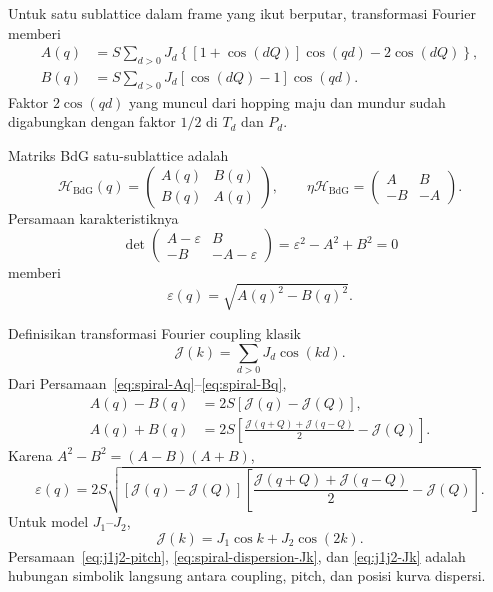 \documentclass[11pt,a4paper]{article}
\newcommand{\mH}{\mathcal H}
\begin{document}
Untuk satu sublattice dalam frame yang ikut berputar, transformasi Fourier memberi
\begin{align}
A(q)&=S\sum_{d>0}J_d
\left\{[1+\cos(dQ)]\cos(qd)-2\cos(dQ)\right\},\label{eq:spiral-Aq}\\
B(q)&=S\sum_{d>0}J_d
[\cos(dQ)-1]\cos(qd).
\label{eq:spiral-Bq}
\end{align}
Faktor $2\cos(qd)$ yang muncul dari hopping maju dan mundur sudah digabungkan dengan faktor $1/2$ di $T_d$ dan $P_d$.

Matriks BdG satu-sublattice adalah
\begin{equation}
\mH_{\mathrm{BdG}}(q)=
\begin{pmatrix}A(q)&B(q)\\B(q)&A(q)\end{pmatrix},
\qquad
\eta\mH_{\mathrm{BdG}}=
\begin{pmatrix}A&B\\-B&-A\end{pmatrix}.
\end{equation}
Persamaan karakteristiknya
\begin{equation}
\det
\begin{pmatrix}
A-\varepsilon&B\\-B&-A-\varepsilon
\end{pmatrix}
=\varepsilon^2-A^2+B^2=0
\end{equation}
memberi
\begin{equation}
\boxed{\varepsilon(q)=\sqrt{A(q)^2-B(q)^2}.}
\label{eq:spiral-dispersion-AB}
\end{equation}

Definisikan transformasi Fourier coupling klasik
\begin{equation}
\mathcal J(k)=\sum_{d>0}J_d\cos(kd).
\end{equation}
Dari Persamaan~\eqref{eq:spiral-Aq}--\eqref{eq:spiral-Bq},
\begin{align}
A(q)-B(q)&=2S[\mathcal J(q)-\mathcal J(Q)],\\
A(q)+B(q)&=2S\left[\frac{\mathcal J(q+Q)+\mathcal J(q-Q)}{2}-\mathcal J(Q)\right].
\end{align}
Karena $A^2-B^2=(A-B)(A+B)$,
\begin{equation}
\boxed{
\varepsilon(q)=2S\sqrt{
[\mathcal J(q)-\mathcal J(Q)]
\left[
\frac{\mathcal J(q+Q)+\mathcal J(q-Q)}{2}-\mathcal J(Q)
\right]}.}
\label{eq:spiral-dispersion-Jk}
\end{equation}
Untuk model $J_1$--$J_2$,
\begin{equation}
\mathcal J(k)=J_1\cos k+J_2\cos(2k).
\label{eq:j1j2-Jk}
\end{equation}
Persamaan~\eqref{eq:j1j2-pitch}, \eqref{eq:spiral-dispersion-Jk}, dan \eqref{eq:j1j2-Jk} adalah hubungan simbolik langsung antara coupling, pitch, dan posisi kurva dispersi.
\end{document}

